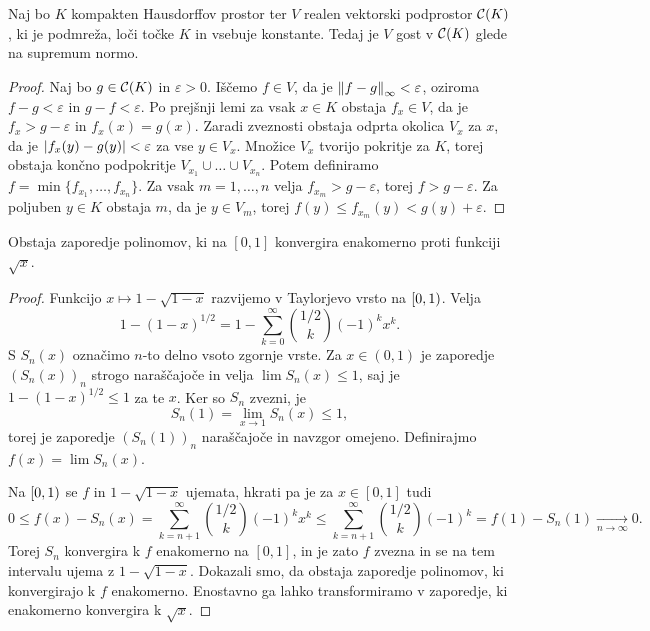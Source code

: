 \begin{izrek}
  Naj bo $K$ kompakten Hausdorffov prostor ter $V$ realen vektorski podprostor
  $\mathcal{C}(K)$, ki je podmreža, loči točke $K$ in vsebuje konstante.
  Tedaj je $V$ gost v $\mathcal{C}(K)$ glede na supremum normo.
\end{izrek}

\begin{proof}
  Naj bo $g \in \mathcal{C}(K)$ in $\varepsilon > 0$.
  Iščemo $f \in V$, da je $\left\lVert f-g\right\rVert_\infty < \varepsilon$, oziroma $f-g <
  \varepsilon$ in $g-f < \varepsilon$.
  Po prejšnji lemi za vsak $x \in K$ obstaja $f_x \in V$, da je $f_x > g -
  \varepsilon$ in $f_x(x) = g(x)$.
  Zaradi zveznosti obstaja odprta okolica $V_x$ za $x$, da je $\left| f_x(y) -
	g(y) \right| < \varepsilon$ za vse $y \in V_x$.
  Množice $V_x$ tvorijo pokritje za $K$, torej obstaja končno podpokritje
  $V_{x_1} \cup \ldots \cup V_{x_n}$.
  Potem definiramo $f = \min \{ f_{x_1}, \ldots, f_{x_n} \}$.
  Za vsak $m = 1, \ldots, n$ velja $f_{x_m} > g - \varepsilon$, torej $f > g -
  \varepsilon$.
  Za poljuben $y \in K$ obstaja $m$, da je $y \in V_m$, torej $f(y) \le
  f_{x_m}(y) < g(y) + \varepsilon$.
\end{proof}


\begin{lema}
  Obstaja zaporedje polinomov, ki na $[0,1]$ konvergira enakomerno proti
  funkciji $\sqrt{x}$.
\end{lema}

\begin{proof}
  Funkcijo $x \mapsto 1 - \sqrt{1-x}$ razvijemo v Taylorjevo vrsto na $\left[0,1\right)$.
  Velja
  \[
	1 - (1 - x)^{1/2} = 1 - \sum_{k=0}^\infty \binom{1/2}{k} (-1)^k x^k.
  \]
  S $S_n(x)$ označimo $n$-to delno vsoto zgornje vrste.
  Za $x \in (0,1)$ je zaporedje $(S_n(x))_n$ strogo naraščajoče in velja $\lim
  S_n(x) \le 1$, saj je $1 - (1 - x)^{1/2} \le 1$ za te $x$.
  Ker so $S_n$ zvezni, je
  \[
	S_n(1) = \lim_{x \to 1} S_n(x) \le 1,
  \]
  torej je zaporedje $(S_n(1))_n$ naraščajoče in navzgor omejeno.
  Definirajmo $f(x) = \lim S_n(x)$.

  Na $\left[0,1\right)$ se $f$ in $1 - \sqrt{1-x}$ ujemata, hkrati pa je za $x \in
  [0,1]$ tudi
  \[
	0 \le f(x) - S_n(x) = \sum_{k=n+1}^\infty \binom{1/2}{k} (-1)^k x^k
	\le \sum_{k=n+1}^\infty \binom{1/2}{k} (-1)^k
	= f(1) - S_n(1) \xrightarrow[n \to \infty]{} 0.
  \]
  Torej $S_n$ konvergira k $f$ enakomerno na $[0,1]$, in je zato $f$ zvezna in
  se na tem intervalu ujema z $1 - \sqrt{1-x}$.
  Dokazali smo, da obstaja zaporedje polinomov, ki konvergirajo k $f$
  enakomerno.
  Enostavno ga lahko transformiramo v zaporedje, ki enakomerno konvergira k
  $\sqrt{x}$.
\end{proof}

